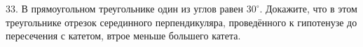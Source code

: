 33. В прямоугольном треугольнике один из углов равен $30^\circ.$ Докажите, что в этом треугольнике отрезок серединного перпендикуляра, проведённого к гипотенузе до пересечения с катетом, втрое меньше большего катета.\\
